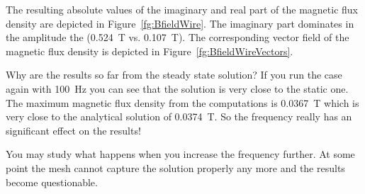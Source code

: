 The resulting absolute values of the imaginary and real part of the magnetic flux density are depicted in
Figure~\ref{fg:BfieldWire}. The imaginary part dominates in the amplitude the (0.524~T vs. 0.107~T). 
The corresponding vector field of the magnetic flux density is depicted in Figure~\ref{fg:BfieldWireVectors}.

Why are the results so far from the steady state solution? If you run the case again with 
100~Hz you can see that the solution is very close to the static one. The maximum magnetic flux density from the
computations is 0.0367~T which is very close to the analytical solution of 0.0374~T. So the frequency
really has an significant effect on the results!

You may study what happens when you increase the frequency further. At some point the mesh cannot capture the solution
properly any more and the results become questionable.

